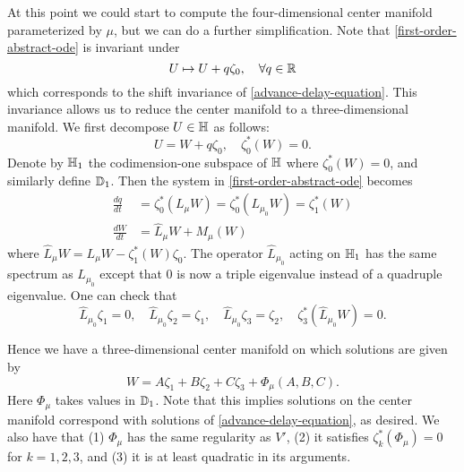 At this point we could start to compute the four-dimensional center manifold parameterized by \(\mu\), but we can do a further simplification. Note that \cref{first-order-abstract-ode} is invariant under 
\begin{equation*}
	U \mapsto U + q \zeta_0, \quad \forall q \in \mathbb{R}
\end{equation*}
which corresponds to the shift invariance of \cref{advance-delay-equation}. This invariance allows us to reduce the center manifold to a three-dimensional manifold. We first decompose \(U \in \mathbb{H}\) as follows:
\begin{equation*}
	U = W + q \zeta_0, \quad \zeta_0^*(W) = 0.
\end{equation*}
Denote by \(\mathbb{H}_1\) the codimension-one subspace of \(\mathbb{H}\) where \(\zeta_0^*(W) = 0\), and similarly define \(\mathbb{D}_1\). Then the system in \cref{first-order-abstract-ode} becomes
\begin{align}
	\frac{dq}{dt} &= \zeta_0^*(L_{\mu} W) = \zeta_0^*(L_{\mu_0} W) = \zeta_1^*(W) \label{ode-for-q} \\
	\frac{d W}{dt} &= \widehat{L}_\mu W + M_\mu(W) \label{reduced-first-order-system}
\end{align}
where \(\widehat{L}_\mu W = L_\mu W - \zeta_1^*(W)\zeta_0\). The operator \(\widehat L_{\mu_0}\) acting on \(\mathbb{H}_1\) has the same spectrum as \(L_{\mu_0}\) except that \(0\) is now a triple eigenvalue instead of a quadruple eigenvalue. One can check that
\begin{equation}\label{reduced-eigenfunction}
	\widehat{L}_{\mu_0} \zeta_1 = 0, \quad \widehat{L}_{\mu_0}\zeta_2 = \zeta_1, \quad \widehat{L}_{\mu_0}\zeta_3 = \zeta_2, \quad \zeta_3^*(\widehat{L}_{\mu_0}W) = 0.
\end{equation}

Hence we have a three-dimensional center manifold on which solutions are given by
\begin{equation}\label{W-center-manifold}
	W = A \zeta_1 + B\zeta_2 + C\zeta_3 +\Phi_\mu(A,B,C).
\end{equation}
Here \(\Phi_\mu\) takes values in \(\mathbb{D}_1\). Note that this implies solutions on the center manifold correspond with solutions of \cref{advance-delay-equation}, as desired. We also have that (1) \(\Phi_\mu\) has the same regularity as \(V'\), (2) it satisfies \(\zeta_k^*(\Phi_\mu) = 0\) for \(k=1,2,3\),  and (3) it is at least quadratic in its arguments.

